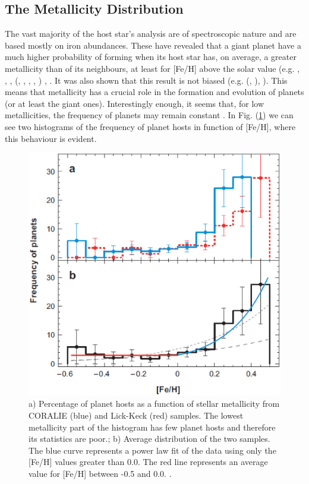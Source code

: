 \documentclass[dvips,12pt,a4paper]{report}
\begin{document}
\subsection {The Metallicity Distribution} 
\label{metal}
The vast majority of the host star's analysis are of spectroscopic nature and are based mostly on iron abundances. These have revealed that a giant planet have a much higher probability of forming when its host star has, on average, a greater metallicity than of its neighbours, at least for [Fe/H] above the solar value (e.g. \citet{Gonzalez-1998}, \citet{Gonzalez-2001}, \citet{Laws-2003}, \citeauthor{Santos-2001a} (\citeyear{Santos-2001b}, \citeyear{Santos-2001a}, \citeyear{Santos-2003}, \citeyear{Santos-2004b}, \citeyear{Santos-2005a}) , \citet{Fischer-2005}. It was also shown that this result is not biased  (e.g. \citeauthor{Santos-2003} (\citeyear{Santos-20	03}, \citeyear{Santos-2004b}), \citet{Fischer-2005}). This means that metallicity has a crucial role in the formation and evolution of planets (or at least the giant ones). Interestingly enough, it seems that, for low metallicities, the frequency of planets may remain constant \citep{Santos-2004b}. In Fig. (\ref{histfeh}) we can see two histograms of the frequency of planet hosts in function of [Fe/H], where this behaviour is evident. 

\begin{figure}[h]
\centering
\includegraphics[height=10 cm]{pics/fehhist}
\caption[Histograms of Frequency of planets with metallicty ]{a) Percentage of planet hosts as a function of stellar metallicity from CORALIE (blue) and Lick-Keck (red) samples. The lowest metallicity part of the histogram has few planet hosts and therefore its statistics are poor.; b) Average distribution of the two samples. The blue curve represents a power law fit of the data using only the [Fe/H] values greater than 0.0. The red line represents an average value for [Fe/H] between -0.5 and 0.0.  \citep{Udry-2007}.}
\label{histfeh}
\end{figure}
\end{document}
